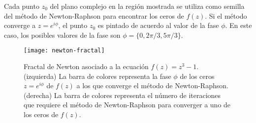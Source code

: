 \documentclass[../portafolio.tex]{subfiles}
\begin{document}
Cada punto $z_0$ del plano complejo en la región mostrada se utiliza como semilla del método de Newton-Raphson para encontrar los ceros de $f(z)$. Si el método converge a $z=e^{i\phi}$, el punto $z_0$ es pintado de acuerdo al valor de la fase $\phi$. En este caso, los posibles valores de la fase son $\phi=\{0,2\pi/3,5\pi/3\}$.

\begin{figure}[ht!]
  \centering
  \texttt{[image: newton-fractal]}
  \caption{Fractal de Newton asociado a la ecuación $f(z)=z^3-1$. (izquierda) La barra de colores representa la fase $\phi$ de los ceros $z=e^{i\phi}$ de $f(z)$ a los que converge el método de Newton-Raphson. (derecha) La barra de colores representa el número de iteraciones que requiere el método de Newton-Raphson para converger a uno de los ceros de $f(z)$. }
  \label{fig:In_series_trapz}
\end{figure}
  

  
\end{document}
